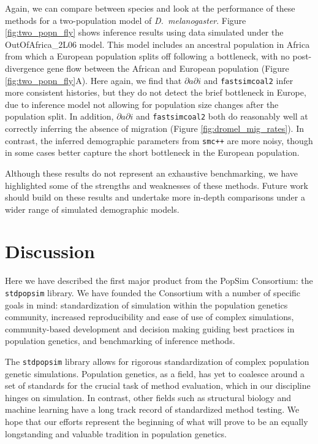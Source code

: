\documentclass[12pt,halfline,a4paper]{ouparticle}
\newcommand{\stdpopsim}{\texttt{stdpopsim}\xspace}
\newcommand{\dadi}{$\partial a \partial i$\xspace}
\newcommand{\smcpp}{\texttt{smc++}\xspace}
\newcommand{\fastsimcoal}{\texttt{fastsimcoal2}\xspace}
\begin{document}
Again, we can compare between species and look at the performance of these methods
for a two-population model of \textit{D.~melanogaster}. Figure
\ref{fig:two_popn_fly} shows inference results using data simulated under
the OutOfAfrica\_2L06 model. This model includes an ancestral population in
Africa from which a European population splits off following a bottleneck, with no
post-divergence gene flow between the African and European population (Figure \ref{fig:two_popn_fly}A).
Here again, we find that \dadi and \fastsimcoal infer more consistent histories,
but they do not detect the brief bottleneck in Europe, due to inference model
not allowing for population size changes after the population split. In addition, \dadi
and \fastsimcoal both do reasonably well at correctly inferring the absence of
migration (Figure \ref{fig:dromel_mig_rates}). In contrast, the inferred
demographic parameters from \smcpp are more noisy, though in some cases better
capture the short bottleneck in the European population.

Although these results do not represent an exhaustive benchmarking,
we have highlighted some of the strengths and weaknesses of these methods.
Future work should build on these results and undertake more in-depth comparisons
under a wider range of simulated demographic models.

\section*{Discussion}

Here we have described the first major product from the PopSim Consortium:
the \stdpopsim library. We have founded the Consortium with a number of specific goals in mind:
standardization of simulation within the population genetics community,
increased reproducibility and ease of use of complex simulations,
community-based development and decision making guiding best practices in population genetics,
and benchmarking of inference methods.

The \stdpopsim library allows for rigorous
standardization of complex population genetic simulations. Population genetics, as a field,
has yet to coalesce around a set of standards for the crucial task of method
evaluation, which in our discipline hinges on simulation. In contrast, other fields such as
structural biology \citep{moult1995large} and machine learning \citep{russakovsky2015imagenet} have a long track record
of standardized method testing. We hope that our efforts represent the beginning of what
will prove to be an equally longstanding and valuable tradition in population genetics.
\end{document}
